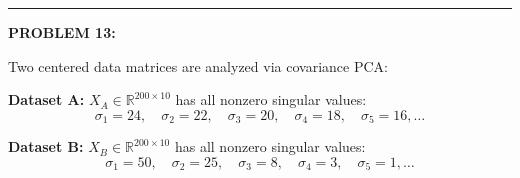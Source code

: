 \documentclass[12pt]{amsart}
\newcommand{\divider}{
  \vspace{-1em} %
  \noindent
  \raisebox{-0.15ex}{\textbullet}%
  \hspace{0.5em}%
  \rule[0.5ex]{0.95\textwidth}{1.0pt}%
  \hspace{0.5em}%
  \raisebox{-0.15ex}{\textbullet}%
  \vspace{0em} %
}
\begin{document}
%
%
%

\divider


\newpage

{\bf PROBLEM 13:}

Two centered data matrices are analyzed via covariance PCA:

\textbf{Dataset A:} $X_A \in \mathbb{R}^{200 \times 10}$ has all nonzero singular values:
$$\sigma_1 = 24, \quad \sigma_2 = 22, \quad \sigma_3 = 20, \quad \sigma_4 = 18, \quad \sigma_5 = 16, \ldots$$

\textbf{Dataset B:} $X_B \in \mathbb{R}^{200 \times 10}$ has all nonzero singular values:
$$\sigma_1 = 50, \quad \sigma_2 = 25, \quad \sigma_3 = 8, \quad \sigma_4 = 3, \quad \sigma_5 = 1, \ldots$$
\end{document}

